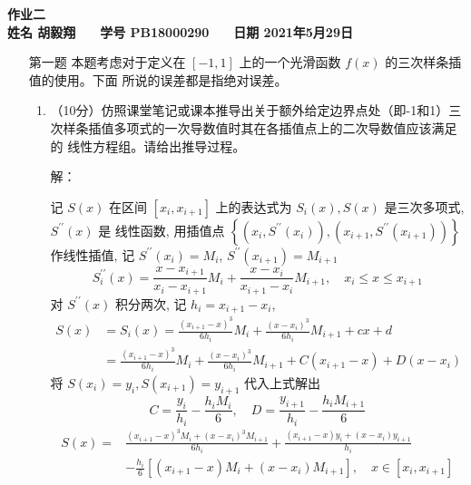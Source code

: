 \documentclass[12pt,a4paper,UTF8]{ctexart}
\begin{document}


\begin{center}
    \textbf{作业二}\\
    \textbf{姓名 胡毅翔 ~~ 学号 PB18000290 ~~ 日期 2021年5月29日}\\
\end{center}

\begin{center}
    \fbox{
        \begin{minipage}{40em}
            \vspace{5cm}
            \hspace{20cm}
        \end{minipage}}
\end{center}
\vspace{1cm}

\begin{enumerate}
    \item[第一题] 本题考虑对于定义在 $[-1,1]$ 上的一个光滑函数 $f(x)$ 的三次样条插值的使用。下面 所说的误差都是指绝对误差。
    \begin{enumerate}\item（10分）仿照课堂笔记或课本推导出关于额外给定边界点处（即-1和1）三
    次样条插值多项式的一次导数值时其在各插值点上的二次导数值应该满足的
    线性方程组。请给出推导过程。
    \par 解：
    \par 记 $S(x)$ 在区间 $\left[x_{i}, x_{i+1}\right]$ 上的表达式为 $S_{i}(x), S(x)$ 是三次多项式, $S^{\prime \prime}(x)$ 是 线性函数, 用插值点 $\left\{\left(x_{i}, S^{\prime \prime}\left(x_{i}\right)\right),\left(x_{i+1}, S^{\prime \prime}\left(x_{i+1}\right)\right)\right\}$ 作线性插值, 记 $S^{\prime \prime}\left(x_{i}\right)=M_{i}$,
    $S^{\prime \prime}\left(x_{i+1}\right)=M_{i+1}$
    $$
    S_{i}^{\prime \prime}(x)=\frac{x-x_{i+1}}{x_{i}-x_{i+1}} M_{i}+\frac{x-x_{i}}{x_{i+1}-x_{i}} M_{i+1}, \quad x_{i} \leqslant x \leqslant x_{i+1}
    $$
    对 $S^{\prime \prime}(x)$ 积分两次, 记 $h_{i}=x_{i+1}-x_{i}$,
    $$
    \begin{aligned}
    S(x) &=S_{i}(x)=\frac{\left(x_{i+1}-x\right)^{3}}{6 h_{i}} M_{i}+\frac{\left(x-x_{i}\right)^{3}}{6 h_{i}} M_{i+1}+c x+d \\
    &=\frac{\left(x_{i+1}-x\right)^{3}}{6 h_{i}} M_{i}+\frac{\left(x-x_{i}\right)^{3}}{6 h_{i}} M_{i+1}+C\left(x_{i+1}-x\right)+D\left(x-x_{i}\right)
    \end{aligned}
    $$
    将 $S\left(x_{i}\right)=y_{i}, S\left(x_{i+1}\right)=y_{i+1}$ 代入上式解出
    $$
    C=\frac{y_{i}}{h_{i}}-\frac{h_{i} M_{i}}{6}, \quad D=\frac{y_{i+1}}{h_{i}}-\frac{h_{i} M_{i+1}}{6}
    $$
    \begin{equation}\label{eq1}
    \begin{aligned}
S(x)=& \frac{\left(x_{i+1}-x\right)^{3} M_{i}+\left(x-x_{i}\right)^{3} M_{i+1}}{6 h_{i}}+\frac{\left(x_{i+1}-x\right) y_{i}+\left(x-x_{i}\right) y_{i+1}}{h_{i}} \\
&-\frac{h_{i}}{6}\left[\left(x_{i+1}-x\right) M_{i}+\left(x-x_{i}\right) M_{i+1}\right], \quad x \in\left[x_{i}, x_{i+1}\right]
\end{aligned}\end{equation}


\end{enumerate}
\end{enumerate}
\end{document}
